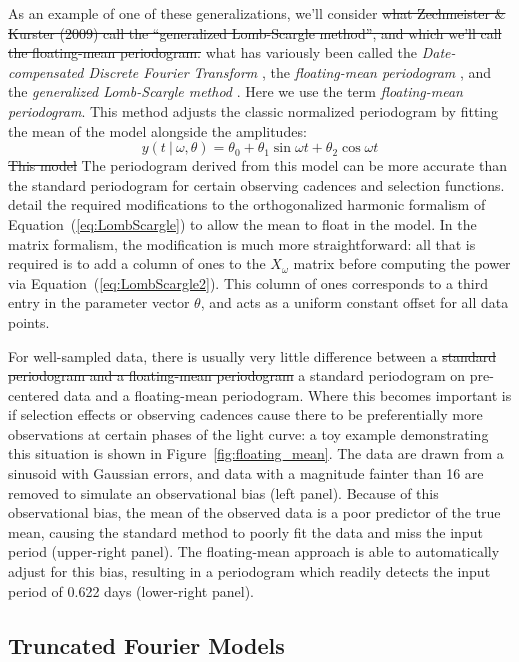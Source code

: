 \documentclass{emulateapj}
\newcommand{\Fig}[1]{Figure~\ref{fig:#1}}
\newcommand{\fig}[1]{\Fig{#1}}
\newcommand{\Eq}[1]{Equation~(\ref{eq:#1})}
\newcommand{\eq}[1]{\Eq{#1}}
\newcommand{\sectlabel}[1]{\label{sect:#1}}
\newcommand{\new}[1]{{\color{red} #1}}
\newcommand{\old}[1]{{\sout{#1}}}
\begin{document}
As an example of one of these generalizations, we'll consider \old{what Zechmeister \& Kurster (2009) call the ``generalized Lomb-Scargle method'', and which we'll call the floating-mean periodogram.}
\new{what has variously been called the {\it Date-compensated Discrete Fourier Transform} \citep{Ferraz-Mello81}, the {\it floating-mean periodogram} \citep{Cumming99}, and the {\it generalized Lomb-Scargle method} \citep{Zechmeister09}. Here we use the term {\it floating-mean periodogram}.} This method adjusts the classic normalized periodogram by fitting the mean of the model alongside the amplitudes:
\begin{equation}
  y(t~|~\omega, \theta) = \theta_0 + \theta_1\sin\omega t + \theta_2\cos\omega t
\end{equation}
\old{This model} \new{The periodogram derived from this model} can be more accurate than the standard periodogram for certain observing cadences and selection functions. \citet{Zechmeister09} detail the required modifications to the \new{orthogonalized} harmonic formalism of \eq{LombScargle} to allow the mean to float in the model. In the matrix formalism, the modification is much more straightforward: all that is required is to add a column of ones to the $X_\omega$ matrix before computing the power via \eq{LombScargle2}. This column of ones corresponds to a third entry in the parameter vector $\theta$, and acts as a uniform constant offset for all data points.

For well-sampled data, there is usually very little difference between a \old{standard periodogram and a floating-mean periodogram} \new{a standard periodogram on pre-centered data and a floating-mean periodogram}. Where this becomes important is if selection effects or observing cadences cause there to be preferentially more observations at certain phases of the light curve: a toy example demonstrating this situation is shown in \fig{floating_mean}. The data are drawn from a sinusoid with Gaussian errors, and data with a magnitude fainter than 16 are removed to simulate an observational bias (left panel). Because of this observational bias, the mean of the observed data is a poor predictor of the true mean, causing the standard method to poorly fit the data and miss the input period (upper-right panel). The floating-mean approach is able to automatically adjust for this bias, resulting in a periodogram which readily detects the input period of 0.622 days (lower-right panel).


\subsection{Truncated Fourier Models}
\sectlabel{multiterm}
\end{document}
